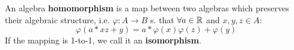 \begin{definition}[Homomorphisms]
	An algebra \textbf{homomorphism} is a map between two algebras which preserves their algebraic structure, i.e. $\varphi: A \to B$ s. that $\forall a \in \mathbb{R}$ and $x, y, z \in A$:
    \[\varphi(a*xz+y) = a*\varphi(x)\varphi(z) + \varphi(y)\]
	If the mapping is 1-to-1, we call it an \textbf{isomorphism}.
\end{definition}

